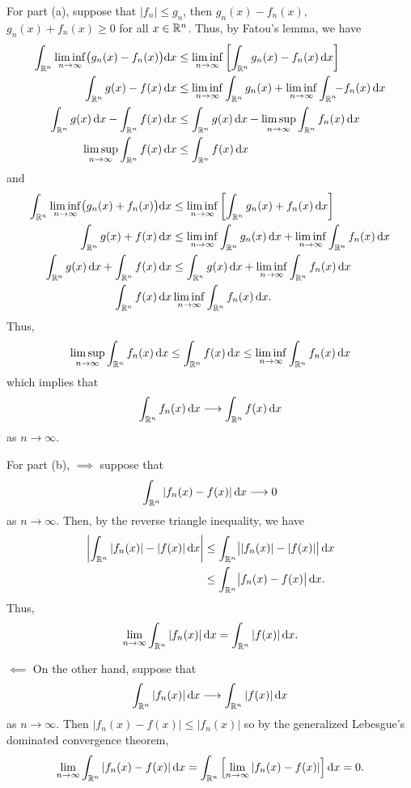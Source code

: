 \begin{solution}
  For part (a), suppose that \(|f_n|\leq g_n\), then \(g_n(x)-f_n(x)\),
  \(g_n(x)+f_n(x)\geq 0\) for all \(x\in\mathbb{R}^n\). Thus, by Fatou's lemma,
  we have
  \begin{align*}
    \int_{\bbR^n}\liminf_{n\to\infty}\bigl(g_n(x)-f_n(x)\bigr)\rmd x
    &\leq\liminf_{n\to\infty}\left[\int_{\bbR^n}g_n(x)-f_n(x)\diff x\right]\\
    \int_{\bbR^n}g(x)-f(x)\diff x
    &\leq\liminf_{n\to\infty}\int_{\bbR^n}g_n(x)+\liminf_{n\to\infty}\int_{\mathrlap{\bbR^n}\phantom{-}}-f_n(x)\diff
      x\\
    \int_{\bbR^n}g(x)\diff x-\int_{\bbR^n}f(x)\diff x
    &\leq\int_{\bbR^n}g(x)\diff x-\limsup_{n\to\infty}\int_{\bbR^n}f_n(x)\diff
      x\\
    \limsup_{n\to\infty}\int_{\bbR^n}f(x)\diff x&\leq\int_{\bbR^n}f(x)\diff
                                                  x
  \end{align*}
  and
  \begin{align*}
    \int_{\bbR^n}\liminf_{n\to\infty}\bigl(g_n(x)+f_n(x)\bigr)\rmd x
    &\leq\liminf_{n\to\infty}\left[\int_{\bbR^n}g_n(x)+f_n(x)\diff
      x\right]\\
    \int_{\bbR^n}g(x)+f(x)\diff x
    &\leq\liminf_{n\to\infty}\int_{\bbR^n}g_n(x)\diff x
      +\liminf_{n\to\infty}\int_{\bbR^n}f_n(x)\diff x\\
    \int_{\bbR^n}g(x)\diff x+\int_{\bbR^n}f(x)\diff x
    &\leq\int_{\bbR^n}g(x)\diff
      x+\liminf_{n\to\infty}\int_{\bbR^n}f_n(x)\diff x\\
    \int_{\bbR^n}f(x)\diff x&\liminf_{n\to\infty}\int_{\bbR^n}f_n(x)\diff x.
  \end{align*}
  Thus,
  \[
    \limsup_{n\to\infty}\int_{\mathbb{R}^n}f_n(x)\mathop{}\!\mathrm{d} x\leq
    \int_{\mathbb{R}^n}f(x)\mathop{}\!\mathrm{d} x\leq
    \liminf_{n\to\infty}\int_{\mathbb{R}^n}f_n(x)\mathop{}\!\mathrm{d} x
  \]
  which implies that
  \[
    \int_{\mathbb{R}^n}f_n(x)\mathop{}\!\mathrm{d} x\longrightarrow\int_{\mathbb{R}^n}f(x)\mathop{}\!\mathrm{d} x
  \]
  as \(n\to\infty\).

  For part (b), \(\implies\) suppose that
  \[
    \int_{\mathbb{R}^n}|f_n(x)-f(x)|\mathop{}\!\mathrm{d} x\longrightarrow 0
  \]
  as \(n\to\infty\). Then, by the reverse triangle inequality, we have
  \begin{align*}
    \left|\int_{\mathbb{R}^n}
    |f_n(x)|-|f(x)|
    \mathop{}\!\mathrm{d} x\right|
    &\leq
      \int_{\mathbb{R}^n}
      \bigl||f_n(x)|-|f(x)|\bigr|
      \mathop{}\!\mathrm{d} x\\
    &\leq\int_{\mathbb{R}^n}
      \bigl|f_n(x)-f(x)\bigr|
      \mathop{}\!\mathrm{d} x.
  \end{align*}
  Thus,
  \[
    \lim_{n\to\infty}\int_{\mathbb{R}^n}|f_n(x)|\mathop{}\!\mathrm{d} x=\int_{\mathbb{R}^n}|f(x)|\mathop{}\!\mathrm{d} x.
  \]

  \(\impliedby\) On the other hand, suppose that
  \[
    \int_{\mathbb{R}^n}|f_n(x)|\mathop{}\!\mathrm{d} x\longrightarrow\int_{\mathbb{R}^n}|f(x)|\mathop{}\!\mathrm{d} x
  \]
  as \(n\to\infty\). Then \(|f_n(x)-f(x)|\leq |f_n(x)|\) so by the
  generalized Lebesgue's dominated convergence theorem,
  \[
    \lim_{n\to\infty}\int_{\mathbb{R}^n}
    |f_n(x)-f(x)|\mathop{}\!\mathrm{d} x=
    \int_{\mathbb{R}^n}\left[\lim_{n\to\infty}|f_n(x)-f(x)|\right]\mathrm{d} x=0.
  \]
\end{solution}

